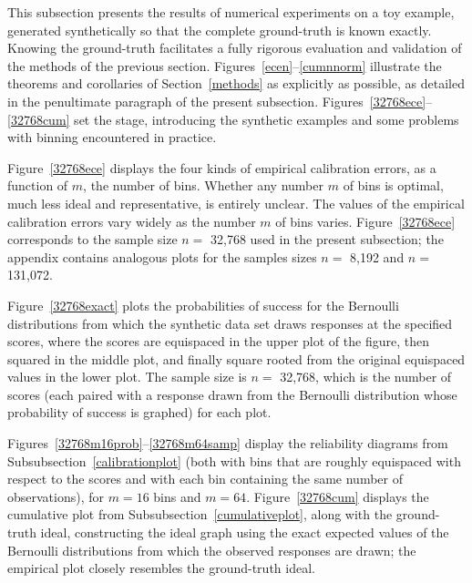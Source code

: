 \documentclass{article}
\begin{document}
This subsection presents the results of numerical experiments
on a toy example, generated synthetically so that the complete ground-truth
is known exactly. Knowing the ground-truth facilitates a fully rigorous
evaluation and validation of the methods of the previous section.
Figures~\ref{ecen}--\ref{cumnnorm} illustrate the theorems and corollaries
of Section~\ref{methods} as explicitly as possible, as detailed
in the penultimate paragraph of the present subsection.
Figures~\ref{32768ece}--\ref{32768cum} set the stage,
introducing the synthetic examples and some problems with binning encountered
in practice.

Figure~\ref{32768ece} displays the four kinds of empirical calibration errors,
as a function of $m$, the number of bins.
Whether any number $m$ of bins is optimal, much less ideal and representative,
is entirely unclear. The values of the empirical calibration errors
vary widely as the number $m$ of bins varies.
Figure~\ref{32768ece} corresponds to the sample size $n =$ 32,768
used in the present subsection; the appendix contains analogous plots
for the samples sizes $n =$ 8,192 and $n =$ 131,072.

Figure~\ref{32768exact} plots the probabilities of success
for the Bernoulli distributions from which the synthetic data set
draws responses at the specified scores, where the scores
are equispaced in the upper plot of the figure,
then squared in the middle plot, and finally square rooted
from the original equispaced values in the lower plot.
The sample size is $n =$ 32,768, which is the number of scores
(each paired with a response drawn from the Bernoulli distribution
whose probability of success is graphed) for each plot.

Figures~\ref{32768m16prob}--\ref{32768m64samp} display the reliability diagrams
from Subsubsection~\ref{calibrationplot}
(both with bins that are roughly equispaced with respect to the scores
and with each bin containing the same number of observations),
for $m = 16$ bins and $m = 64$.
Figure~\ref{32768cum} displays the cumulative plot
from Subsubsection~\ref{cumulativeplot},
along with the ground-truth ideal, constructing the ideal graph
using the exact expected values of the Bernoulli distributions
from which the observed responses are drawn; the empirical plot
closely resembles the ground-truth ideal.
\end{document}
